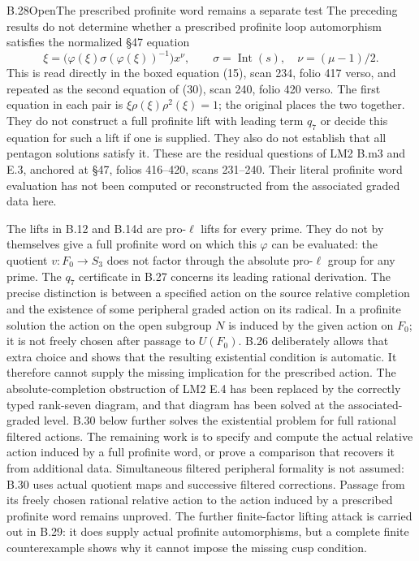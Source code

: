\begin{statement}{B.28}{Open}{The prescribed profinite word remains a separate test}
The preceding results do not determine whether a prescribed profinite
loop automorphism satisfies the normalized \S47 equation
\[
 \xi=\bigl(\varphi(\xi)\sigma(\varphi(\xi))^{-1}\bigr)x^\nu,
 \qquad \sigma=\operatorname{Int}(s),\quad \nu=(\mu-1)/2.
\]
This is read directly in the boxed equation (15), scan 234,
folio 417 verso, and repeated as the second equation of (30),
scan 240, folio 420 verso. The first equation in each pair is
$\xi\rho(\xi)\rho^2(\xi)=1$; the original places the two together.
They do not construct a full profinite lift with leading term $q_7$
or decide this equation for such a lift if one is supplied. They also
do not establish that all pentagon solutions satisfy it.
These are the residual questions of LM2 B.m3 and E.3, anchored at
\S47, folios 416--420, scans 231--240. Their literal profinite
word evaluation has not been computed or reconstructed from the
associated graded data here.
\end{statement}
The lifts in B.12 and B.14d are pro-$\ell$ lifts for every prime. They do not by
themselves give a full profinite word on which this $\varphi$ can be
evaluated: the quotient $v:F_0\to S_3$ does not factor through the
absolute pro-$\ell$ group for any prime. The $q_7$ certificate in
B.27 concerns its leading rational derivation.
The precise distinction is between a specified action on the source
relative completion and the existence of some peripheral graded action
on its radical. In a profinite solution the action on the open subgroup
$N$ is induced by the given action on $F_0$; it is not freely chosen
after passage to $U(F_0)$. B.26 deliberately allows that extra choice
and shows that the resulting existential condition is automatic. It
therefore cannot supply the missing implication for the prescribed
action. The absolute-completion obstruction of LM2 E.4 has been
replaced by the correctly typed rank-seven diagram, and that diagram
has been solved at the associated-graded level. B.30 below further
solves the existential problem for full rational filtered actions.
The remaining work is
to specify and compute the actual relative action induced by a full
profinite word, or prove a comparison that recovers it from additional
data. Simultaneous filtered peripheral formality is not assumed:
B.30 uses actual quotient maps and successive filtered corrections.
Passage from its freely chosen rational relative action to the
action induced by a prescribed profinite word remains unproved.
The further finite-factor lifting attack is carried out in B.29:
it does supply actual profinite automorphisms, but a complete finite
counterexample shows why it cannot impose the missing cusp condition.



